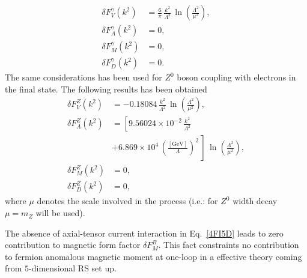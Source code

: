 \begin{align}
 \delta F_V^\gamma(k^2) &= \frac{6}{\pi}\,\frac{k^2}{\Lambda^2}\,\ln\left(\frac{\Lambda^2}{\mu^2}\right), \\
 \delta F_A^\gamma(k^2) &= 0 , \\
 \delta F_M^\gamma(k^2) &= 0 , \\
 \delta F_D^\gamma(k^2) &= 0.
\end{align}
The same considerations has been used for $Z^0$ boson coupling with electrons in the final state. The following results has been obtained
\begin{align}
 \delta F_V^Z(k^2) &= -0.18084\,\frac{k^2}{\Lambda^2}\,\ln\left(\frac{\Lambda^2}{\mu^2}\right), \\
 \nonumber
 \delta F_A^Z(k^2) &= \left[9.56024\times10^{-2}\,\frac{k^2}{\Lambda^2} \right. \\
 & \left.+6.869\times10^4\,\left(\frac{[\text{GeV}]}{\Lambda}\right)^2\,\right]\,\ln\left(\frac{\Lambda^2}{\mu^2}\right), \\
 \delta F_M^Z(k^2) &= 0 , \\
 \delta F_D^Z(k^2) &= 0 ,
\end{align}
where $\mu$ denotes the scale involved in the process (i.e.: for $Z^0$ width decay $\mu=m_Z$ will be used).

The absence of axial-tensor current interaction in Eq.~\eqref{4FI5D} leads to zero contribution to magnetic form factor $\delta F_M^B$. This fact constraints no contribution to fermion anomalous magnetic moment at one-loop in a effective theory coming from $5$-dimensional RS set up.

